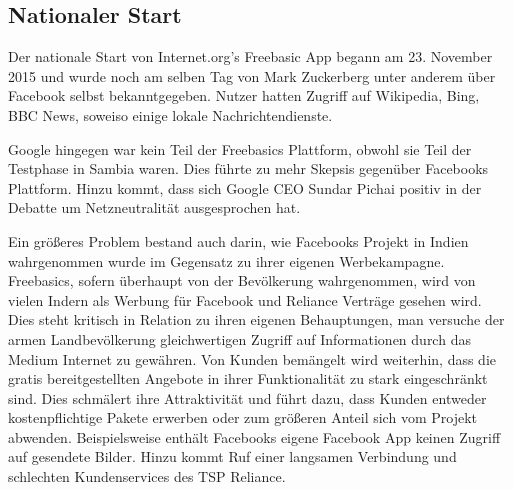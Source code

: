 \documentclass{article}
\begin{document}
\subsection{Nationaler Start}
Der nationale Start von Internet.org's Freebasic App begann am 23. November 2015 und wurde noch am selben Tag von Mark Zuckerberg unter anderem über Facebook selbst bekanntgegeben. Nutzer hatten Zugriff auf Wikipedia, Bing, BBC News, soweiso einige lokale Nachrichtendienste.
	
Google hingegen war kein Teil der Freebasics Plattform, obwohl sie Teil der Testphase in Sambia waren. Dies führte zu mehr Skepsis gegenüber Facebooks Plattform. Hinzu kommt, dass sich Google CEO Sundar Pichai positiv in der Debatte um Netzneutralität ausgesprochen hat.
	
Ein größeres Problem bestand auch darin, wie Facebooks Projekt in Indien wahrgenommen wurde im Gegensatz zu ihrer eigenen Werbekampagne.
Freebasics, sofern überhaupt von der Bevölkerung wahrgenommen, wird von vielen Indern als Werbung für Facebook und Reliance Verträge gesehen wird. Dies steht kritisch in Relation zu ihren eigenen Behauptungen, man versuche der armen Landbevölkerung gleichwertigen Zugriff auf Informationen durch das Medium Internet zu gewähren.
Von Kunden bemängelt wird weiterhin, dass die gratis bereitgestellten Angebote in ihrer Funktionalität zu stark eingeschränkt sind. Dies schmälert ihre Attraktivität und führt dazu, dass Kunden entweder kostenpflichtige Pakete erwerben oder zum größeren Anteil sich vom Projekt abwenden.
Beispielsweise enthält Facebooks eigene Facebook App keinen Zugriff auf gesendete Bilder. Hinzu kommt Ruf einer langsamen Verbindung und schlechten Kundenservices des TSP Reliance.
	
\end{document}
